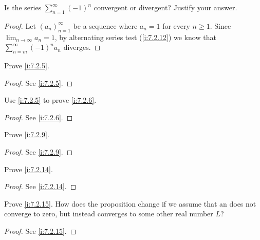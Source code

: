\exercisesection

\begin{ex}\label{i:ex:7.2.1}
  Is the series \(\sum_{n = 1}^\infty (-1)^n\) convergent or divergent?
  Justify your answer.
\end{ex}

\begin{proof}
  Let \((a_n)_{n = 1}^\infty\) be a sequence where \(a_n = 1\) for every \(n \geq 1\).
  Since \(\lim_{n \to \infty} a_n = 1\), by alternating series test (\cref{i:7.2.12}) we know that \(\sum_{n = m}^\infty (-1)^n a_n\) diverges.
\end{proof}

\begin{ex}\label{i:ex:7.2.2}
  Prove \cref{i:7.2.5}.
\end{ex}

\begin{proof}
  See \cref{i:7.2.5}.
\end{proof}

\begin{ex}\label{i:ex:7.2.3}
  Use \cref{i:7.2.5} to prove \cref{i:7.2.6}.
\end{ex}

\begin{proof}
  See \cref{i:7.2.6}.
\end{proof}

\begin{ex}\label{i:ex:7.2.4}
  Prove \cref{i:7.2.9}.
\end{ex}

\begin{proof}
  See \cref{i:7.2.9}.
\end{proof}

\begin{ex}\label{i:ex:7.2.5}
  Prove \cref{i:7.2.14}.
\end{ex}

\begin{proof}
  See \cref{i:7.2.14}.
\end{proof}

\begin{ex}\label{i:ex:7.2.6}
  Prove \cref{i:7.2.15}.
  How does the proposition change if we assume that an does not converge to zero, but instead converges to some other real number \(L\)?
\end{ex}

\begin{proof}
  See \cref{i:7.2.15}.
\end{proof}
